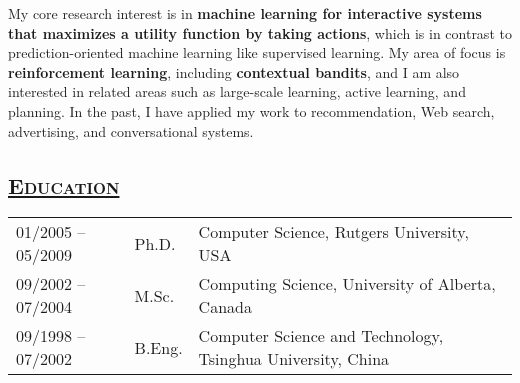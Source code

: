 \documentclass[10pt,twoside,letterpaper]{article}
\newcommand{\tabrowsep}{\vspace{1mm}}
\begin{document}
My core research interest is in \textbf{machine learning for interactive systems that maximizes a utility function by taking
actions}, which is in contrast to prediction-oriented machine learning like supervised learning. My area of focus is
\textbf{reinforcement learning}, including \textbf{contextual bandits}, and I am also interested in related areas such as large-scale learning, active learning, and planning. In the past, I have applied my work to recommendation,
Web search, advertising, and conversational systems.

\subsection*{\textsc{\underline{Education}}}

\begin{center}
\begin{tabular}{p{30mm} p{15mm} p{115mm}}
01/2005 -- 05/2009 & Ph.D. & Computer Science, Rutgers University, USA \\
09/2002 -- 07/2004 & M.Sc. & Computing Science, University of Alberta, Canada \\
09/1998 -- 07/2002 & B.Eng. & Computer Science and Technology, Tsinghua University, China %
\end{tabular}
\end{center}
\end{document}
